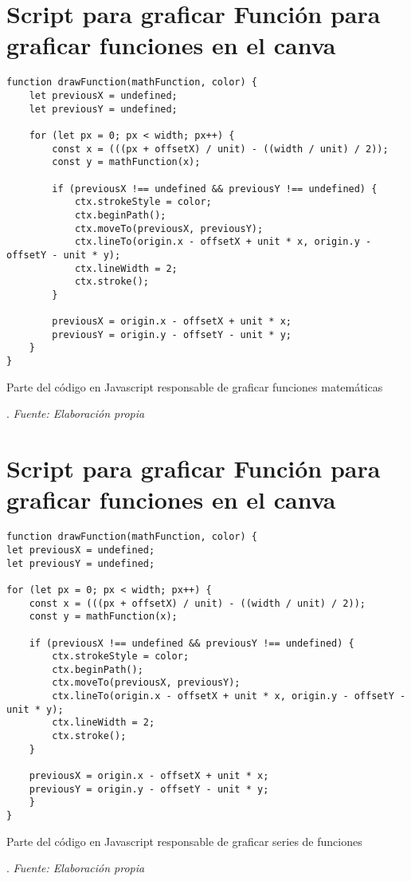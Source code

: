 \section{Script para graficar Función para graficar funciones en el canva}  \label{app3:canva_js_funciones}
\begin{longlisting}
	\begin{verbatim}
function drawFunction(mathFunction, color) {
	let previousX = undefined;
	let previousY = undefined;
	
	for (let px = 0; px < width; px++) {
		const x = (((px + offsetX) / unit) - ((width / unit) / 2));
		const y = mathFunction(x);
		
		if (previousX !== undefined && previousY !== undefined) {
			ctx.strokeStyle = color;
			ctx.beginPath();
			ctx.moveTo(previousX, previousY);
			ctx.lineTo(origin.x - offsetX + unit * x, origin.y - offsetY - unit * y);
			ctx.lineWidth = 2;
			ctx.stroke();
		}
		
		previousX = origin.x - offsetX + unit * x;
		previousY = origin.y - offsetY - unit * y;
	}
}
	\end{verbatim}
	\caption[Parte del código en Javascript responsable de graficar funciones matemáticas] {Parte del código en Javascript responsable de graficar funciones matemáticas}. \textit{Fuente: Elaboración propia}
\end{longlisting}

\section{Script para graficar Función para graficar funciones en el canva} \label{app3:canva_js_series}
\begin{longlisting}
	\begin{verbatim}
function drawFunction(mathFunction, color) {
let previousX = undefined;
let previousY = undefined;
			
for (let px = 0; px < width; px++) {
	const x = (((px + offsetX) / unit) - ((width / unit) / 2));
	const y = mathFunction(x);
		
	if (previousX !== undefined && previousY !== undefined) {
		ctx.strokeStyle = color;
		ctx.beginPath();
		ctx.moveTo(previousX, previousY);
		ctx.lineTo(origin.x - offsetX + unit * x, origin.y - offsetY - unit * y);
		ctx.lineWidth = 2;
		ctx.stroke();
	}
		
	previousX = origin.x - offsetX + unit * x;
	previousY = origin.y - offsetY - unit * y;
	}
}
	\end{verbatim}
		\caption[Parte del código en Javascript responsable de graficar series de funciones] {Parte del código en Javascript responsable de graficar series de funciones}. \textit{Fuente: Elaboración propia}
\end{longlisting}

